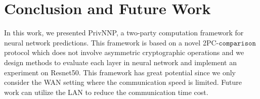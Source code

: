 \documentclass[letterpaper]{article} %
\begin{document}
    \section{Conclusion and Future Work}
    In this work, we presented PrivNNP, a two-party computation framework for neural network predictions.
    This framework is based on a novel 2PC-$\mathtt{comparison}$ protocol which does not involve asymmetric cryptographic operations
    and we design methods to evaluate each layer in neural network and implement an experiment on Resnet50.
    This framework has great potential
    since we only consider the WAN setting where the communication speed is limited.
    Future work can utilize the LAN to reduce the communication time cost.



\end{document}
